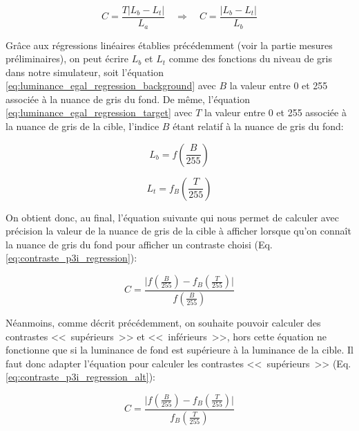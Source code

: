 	\begin{equation}
		C = \frac{T \vert L_b - L_t \vert}{L_a} \quad \Rightarrow \quad C = \frac{\vert L_b - L_t \vert}{L_b}
		\label{eq:contraste_p3i}
	\end{equation}
	
	\par Grâce aux régressions linéaires établies précédemment (voir la partie mesures préliminaires), on peut écrire $L_b$ et $L_t$ comme des fonctions du niveau de gris dans notre simulateur, soit l'équation \ref{eq:luminance_egal_regression_background} avec $B$ la valeur entre 0 et 255 associée à la nuance de gris du fond. De même, l'équation \ref{eq:luminance_egal_regression_target} avec $T$ la valeur entre 0 et 255 associée à la nuance de gris de la cible, l'indice $B$ étant relatif à la nuance de gris du fond:
	
	\begin{equation}
		L_b = f\left( \frac{B}{255} \right)
		\label{eq:luminance_egal_regression_background}
	\end{equation}
	
	\begin{equation}
		L_t = f_B\left( \frac{T}{255} \right)
		\label{eq:luminance_egal_regression_target}
	\end{equation}
	
	\par On obtient donc, au final, l'équation suivante qui nous permet de calculer avec précision la valeur de la nuance de gris de la cible à afficher lorsque qu'on connaît la nuance de gris du fond pour afficher un contraste choisi (Eq. \ref{eq:contraste_p3i_regression}):
	
	\begin{equation}
		C = \frac{\vert f\left( \frac{B}{255} \right) - f_B\left( \frac{T}{255} \right) \vert}{f\left( \frac{B}{255} \right)}
		\label{eq:contraste_p3i_regression}
	\end{equation}
	
	\par Néanmoins, comme décrit précédemment, on souhaite pouvoir calculer des contrastes <<~supérieurs~>> et <<~inférieurs~>>, hors cette équation ne fonctionne que si la luminance de fond est supérieure à la luminance de la cible. Il faut donc adapter l'équation pour calculer les contrastes <<~supérieurs~>> (Eq. \ref{eq:contraste_p3i_regression_alt}):
	
	\begin{equation}
		C = \frac{\vert f\left( \frac{B}{255} \right) - f_B\left( \frac{T}{255} \right) \vert}{f_B\left( \frac{T}{255} \right)}
		\label{eq:contraste_p3i_regression_alt}
	\end{equation}
	

